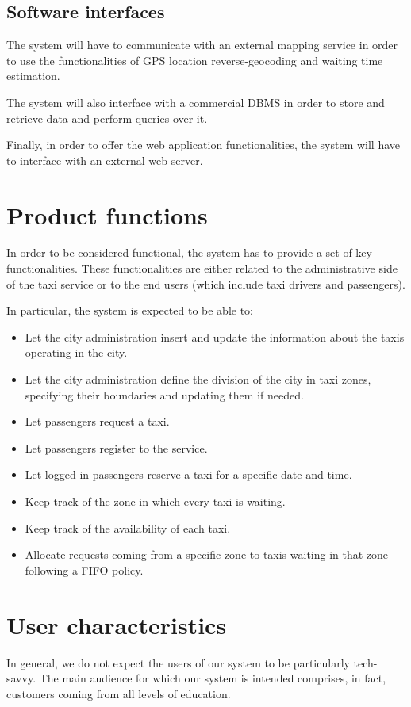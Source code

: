 \subsection{Software interfaces}
The system will have to communicate with an external mapping service in order to use the functionalities of GPS location reverse-geocoding and waiting time estimation.

The system will also interface with a commercial DBMS in order to store and retrieve data and perform queries over it.

Finally, in order to offer the web application functionalities, the system will have to interface with an external web server.


\section{Product functions}
In order to be considered functional, the system has to provide a set of key functionalities.
These functionalities are either related to the administrative side of the taxi service or to the end users (which include taxi drivers and passengers).

In particular, the system is expected to be able to:
\begin{itemize}
\item Let the city administration insert and update the information about the taxis operating in the city.
\item Let the city administration define the division of the city in taxi zones, specifying their boundaries and updating them if needed.
\item Let passengers request a taxi.
\item Let passengers register to the service.
\item Let logged in passengers reserve a taxi for a specific date and time.
\item Keep track of the zone in which every taxi is waiting.
\item Keep track of the availability of each taxi.
\item Allocate requests coming from a specific zone to taxis waiting in that zone following a FIFO policy.
\end{itemize}


\section{User characteristics}
In general, we do not expect the users of our system to be particularly tech-savvy. 
The main audience for which our system is intended comprises, in fact, customers coming from all levels of education.


